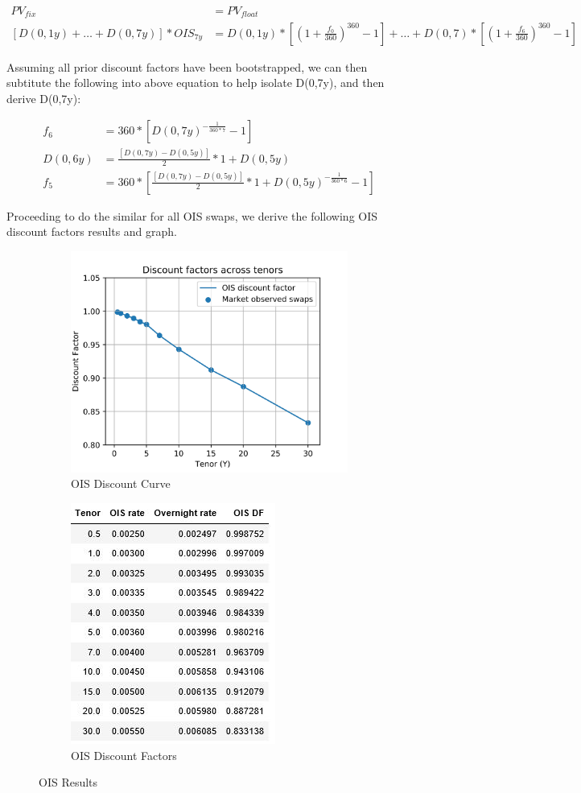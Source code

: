 \documentclass{article}
\begin{document}
\begin{align*}
PV_{fix} &= PV_{float} \\
[D(0,1y) + \dots + D(0,7y)] * OIS_{7y} &= D(0,1y) * [(1 + \frac{f_0}{360})^{360} - 1] + \dots + D(0,7) * [(1 + \frac{f_{6}}{360})^{360} - 1] 
\end{align*} 

\noindent* Assuming all prior discount factors have been bootstrapped, we can then subtitute the following into above equation to help isolate D(0,7y), and then derive D(0,7y): 

\begin{align*}
	f_6 &= 360 * [D(0,7y)^{-\frac{1}{360*7}} - 1]   \\
	D(0,6y) &= \frac{[D(0,7y) - D(0,5y)]}{2}*1 + D(0,5y)\\
	f_5 &= 360 * [\frac{[D(0,7y) - D(0,5y)]}{2}*1 + D(0,5y)^{-\frac{1}{360*6}} - 1]
\end{align*}


\noindent Proceeding to do the similar for all OIS swaps, we derive the following OIS discount factors results and graph.

\begin{figure}[h]
	\centering
	\begin{subfigure}{.5\textwidth}
		\centering
		\includegraphics[width=.4\linewidth]{./images/OIS_df.jpg}
		\caption{OIS Discount Curve}
		\label{fig:sub1}
	\end{subfigure}%
	\begin{subfigure}{.5\textwidth}
		\centering
		\includegraphics[width=.4\linewidth]{./images/OIStable.jpg}
		\caption{OIS Discount Factors}
		\label{fig:sub2}
	\end{subfigure}
	\caption{OIS Results}
	\label{fig:test}
\end{figure}
\end{document}
